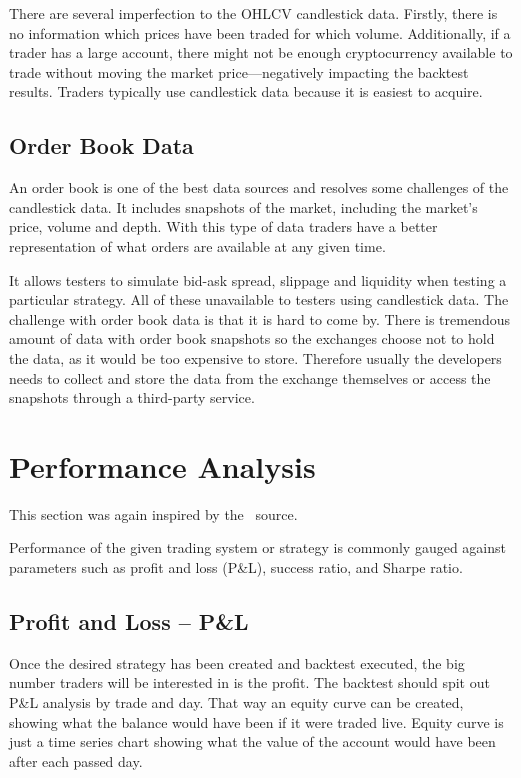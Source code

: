 There are several imperfection to the OHLCV candlestick data. Firstly, there is no information which prices have been traded for which volume. Additionally, if a trader has a large account, there might not be enough cryptocurrency available to trade without moving the market price---negatively impacting the backtest results. Traders typically use candlestick data because it is easiest to acquire.

\subsection*{Order Book Data}
An order book is one of the best data sources and resolves some challenges of the candlestick data. It includes snapshots of the market, including the market's price, volume and depth. With this type of data traders have a better representation of what orders are available at any given time.

It allows testers to simulate bid-ask spread, slippage and liquidity when testing a particular strategy. All of these unavailable to testers using candlestick data. The challenge with order book data is that it is hard to come by. There is tremendous amount of data with order book snapshots so the exchanges choose not to hold the data, as it would be too expensive to store. Therefore usually the developers needs to collect and store the data from the exchange themselves or access the snapshots through a third-party service.

\section{Performance Analysis}
\label{performance-analysis}
This section was again inspired by the~\cite{backtesting-crypto-trading-strategies} source.

Performance of the given trading system or strategy is commonly gauged against parameters such as profit and loss (P\&L), success ratio, and Sharpe ratio.

\subsection*{Profit and Loss -- P\&L}
Once the desired strategy has been created and backtest executed, the big number traders will be interested in is the profit. The backtest should spit out P\&L analysis by trade and day. That way an equity curve can be created, showing what the balance would have been if it were traded live. Equity curve is just a time series chart showing what the value of the account would have been after each passed day.


